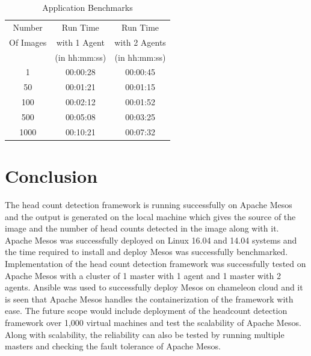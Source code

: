 \documentclass[9pt,twocolumn,twoside]{../../styles/osajnl}
\begin{document}
\begin{table}[htbp]
\centering
\caption{Application Benchmarks} 
\label{Application Benchmarks}
\begin{tabular}{|c|c|c|}
  \hline
  Number & Run Time & Run Time\\
  Of Images & with 1 Agent & with 2 Agents\\
   & (in hh:mm:ss) & (in hh:mm:ss)\\
  \hline
  1 & 00:00:28 & 00:00:45 \\
  \hline
  50 & 00:01:21 & 00:01:15 \\
  \hline
  100 & 00:02:12 & 00:01:52 \\
  \hline
  500 & 00:05:08 & 00:03:25 \\
  \hline
  1000 & 00:10:21 & 00:07:32 \\
  \hline 
\end{tabular}
\end{table}


\section{Conclusion}
The head count detection framework is running successfully on Apache
Mesos and the output is generated on the local machine which gives the
source of the image and the number of head counts detected in the
image along with it. Apache Mesos was successfully deployed on Linux
16.04 and 14.04 systems and the time required to install and deploy
Mesos was successfully benchmarked. Implementation of the head count
detection framework was successfully tested on Apache Mesos with a
cluster of 1 master with 1 agent and 1 master with 2 agents. Ansible
was used to successfully deploy Mesos on chameleon cloud and it is
seen that Apache Mesos handles the containerization of the framework
with ease. The future scope would include deployment of the headcount
detection framework over 1,000 virtual machines and test the
scalability of Apache Mesos. Along with scalability, the reliability
can also be tested by running multiple masters and checking the fault
tolerance of Apache Mesos.



\end{document}
